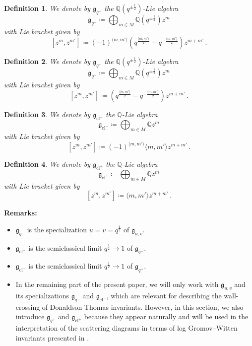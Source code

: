 \documentclass[12pt, a4paper]{amsart}
\newtheorem{defn}{Definition}[section]
\newcommand\Q{\mathbb Q}
\newcommand\fg{\mathfrak g}
\newcommand\cl{\operatorname{cl}}
\begin{document}
\begin{defn}
We denote by $\fg_{q^-}$ the $\Q(q^{\pm \frac{1}{2}})$-Lie algebra 
\[\fg_{q^-} \coloneq \bigoplus_{m \in M} 
\Q(q^{\pm \frac{1}{2}})
z^m\]
with Lie bracket given by
\[[z^m, z^{m'}] \coloneq 
(-1)^{\langle m,m'\rangle}(q^{\frac{\langle m,m' \rangle}{2}}
-q^{-\frac{\langle m,m' \rangle}{2}}) z^{m+m'}\,.\]
\end{defn}


\begin{defn}
We denote by $\fg_{q^+}$ the $\Q(q^{\pm \frac{1}{2}})$-Lie algebra 
\[\fg_{q^+} \coloneq \bigoplus_{m \in M} 
\Q(q^{\pm \frac{1}{2}})
z^m\]
with Lie bracket given by
\[[z^m, z^{m'}] \coloneq 
(q^{\frac{\langle m,m' \rangle}{2}}
-q^{-\frac{\langle m,m' \rangle}{2}}) z^{m+m'}\,.\]
\end{defn}

\begin{defn}
We denote by $\fg_{\cl^-}$ the $\Q$-Lie algebra 
\[\fg_{\cl^-} \coloneq \bigoplus_{m \in M} \Q z^m\]
with Lie bracket given by
\[[z^m, z^{m'}] \coloneq (-1)^{\langle m,m' \rangle} 
\langle m,m' \rangle z^{m+m'}\,.\]
\end{defn}

\begin{defn}
We denote by $\fg_{\cl^+}$ the $\Q$-Lie algebra 
\[\fg_{\cl^+} \coloneq \bigoplus_{m \in M} \Q z^m\]
with Lie bracket given by
\[[z^m, z^{m'}] \coloneq 
\langle m,m' \rangle z^{m+m'}\,.\]
\end{defn}


\textbf{Remarks:} 
\begin{itemize}
\item[(i)] $\fg_{q^-}$ is the specialization $u=v=q^{\frac{1}{2}}$
of $\fg_{u,v}$.
\item[(ii)] $\fg_{\cl^-}$ is the semiclassical limit $q^{\frac{1}{2}} \rightarrow 1$ of $\fg_{q^-}$.
\item[(iii)] $\fg_{\cl^+}$ is the semiclassical
limit $q^{\frac{1}{2}} \rightarrow 1$ 
of $\fg_{q^+}$.
\item[(iv)] In the remaining part of the present paper, we will only work 
with $\fg_{u,v}$ and its specializations $\fg_{q^-}$ and $\fg_{\cl^-}$, which are relevant for describing the wall-crossing of Donaldson-Thomas invariants. However, in this section, we also introduce $\fg_{q^+}$ and $\fg_{\cl^+}$ because they appear naturally and will be used in the interpretation of the scattering diagrams in terms of log Gromov--Witten invariants presented in \cite{bousseau2019takahashi}.
\end{itemize}
\end{document}
